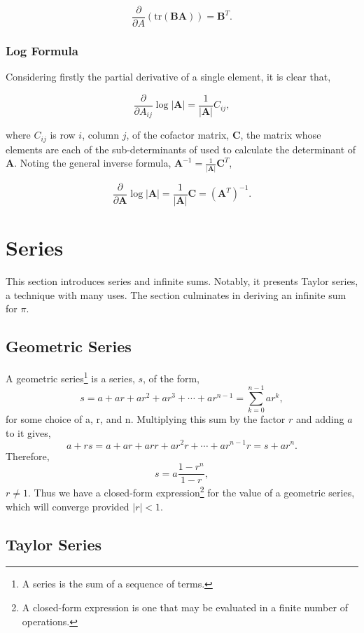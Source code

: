 \documentclass[11pt]{amsart}
\begin{document}
$$\frac{\partial}{\partial A} (\text{tr}(\mathbf{BA})) = \mathbf{B}^T.$$

\subsubsection{Log Formula}

Considering firstly the partial derivative of a single element, it is clear that,

$$\frac{\partial}{\partial A_{ij}}\log|\mathbf{A}| = \frac{1}{|\mathbf{A}|}C_{ij},$$

where $C_{ij}$ is row $i$, column $j$, of the cofactor matrix, $\mathbf{C}$, the matrix whose elements are each of the sub-determinants of used to calculate the determinant of $\mathbf{A}$. Noting the general inverse formula, $\mathbf{A}^{-1} = \frac{1}{|\mathbf{A}|}\mathbf{C}^T$,

$$\frac{\partial}{\partial \mathbf{A}}\log|\mathbf{A}| = \frac{1}{|\mathbf{A}|}\mathbf{C} = (\mathbf{A}^T)^{-1}.$$

\section{Series}

This section introduces series and infinite sums. Notably, it presents Taylor series, a technique with many uses. The section culminates in deriving an infinite sum for $\pi$.

\subsection{Geometric Series}

A geometric series\footnote{A series is the sum of a sequence of terms.} is a series, $s$, of the form, $$s = a + ar + ar^2 + ar^3 + \cdots + ar^{n-1} = \sum_{k=0}^{n-1}ar^k,$$ for some choice of a, r, and n. Multiplying this sum by the factor $r$ and adding $a$ to it gives, $$a + rs = a + ar + arr + ar^2r + \cdots + ar^{n-1}r = s + ar^n.$$ Therefore, $$s = a\frac{1 - r^n}{1 - r},$$ $r \neq 1$. Thus we have a closed-form expression\footnote{A closed-form expression is one that may be evaluated in a finite number of operations.} for the value of a geometric series, which will converge provided $|r| < 1$.

\subsection{Taylor Series}
\end{document}
